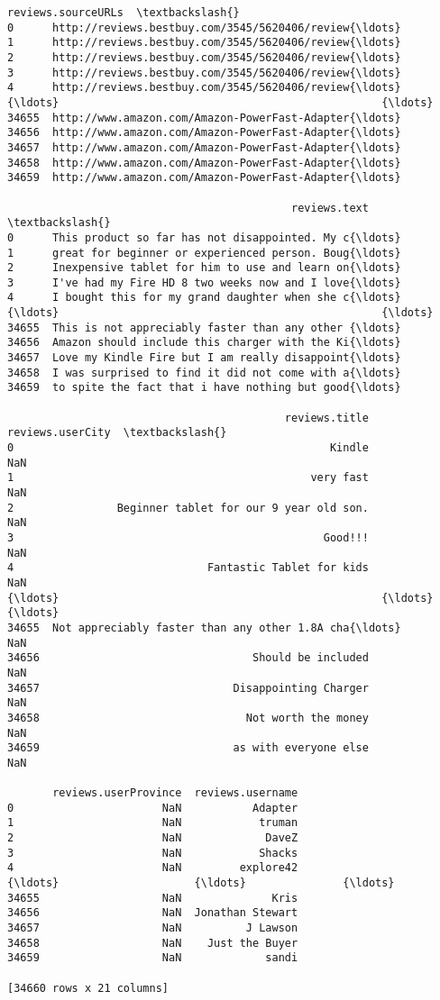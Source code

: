 \documentclass[11pt]{article}
\begin{document}
\begin{Verbatim}[commandchars=\\\{\}]
                                      reviews.sourceURLs  \textbackslash{}
0      http://reviews.bestbuy.com/3545/5620406/review{\ldots}
1      http://reviews.bestbuy.com/3545/5620406/review{\ldots}
2      http://reviews.bestbuy.com/3545/5620406/review{\ldots}
3      http://reviews.bestbuy.com/3545/5620406/review{\ldots}
4      http://reviews.bestbuy.com/3545/5620406/review{\ldots}
{\ldots}                                                  {\ldots}
34655  http://www.amazon.com/Amazon-PowerFast-Adapter{\ldots}
34656  http://www.amazon.com/Amazon-PowerFast-Adapter{\ldots}
34657  http://www.amazon.com/Amazon-PowerFast-Adapter{\ldots}
34658  http://www.amazon.com/Amazon-PowerFast-Adapter{\ldots}
34659  http://www.amazon.com/Amazon-PowerFast-Adapter{\ldots}

                                            reviews.text  \textbackslash{}
0      This product so far has not disappointed. My c{\ldots}
1      great for beginner or experienced person. Boug{\ldots}
2      Inexpensive tablet for him to use and learn on{\ldots}
3      I've had my Fire HD 8 two weeks now and I love{\ldots}
4      I bought this for my grand daughter when she c{\ldots}
{\ldots}                                                  {\ldots}
34655  This is not appreciably faster than any other {\ldots}
34656  Amazon should include this charger with the Ki{\ldots}
34657  Love my Kindle Fire but I am really disappoint{\ldots}
34658  I was surprised to find it did not come with a{\ldots}
34659  to spite the fact that i have nothing but good{\ldots}

                                           reviews.title reviews.userCity  \textbackslash{}
0                                                 Kindle              NaN
1                                              very fast              NaN
2                Beginner tablet for our 9 year old son.              NaN
3                                                Good!!!              NaN
4                              Fantastic Tablet for kids              NaN
{\ldots}                                                  {\ldots}              {\ldots}
34655  Not appreciably faster than any other 1.8A cha{\ldots}              NaN
34656                                 Should be included              NaN
34657                              Disappointing Charger              NaN
34658                                Not worth the money              NaN
34659                              as with everyone else              NaN

       reviews.userProvince  reviews.username
0                       NaN           Adapter
1                       NaN            truman
2                       NaN             DaveZ
3                       NaN            Shacks
4                       NaN         explore42
{\ldots}                     {\ldots}               {\ldots}
34655                   NaN              Kris
34656                   NaN  Jonathan Stewart
34657                   NaN          J Lawson
34658                   NaN    Just the Buyer
34659                   NaN             sandi

[34660 rows x 21 columns]
    \end{Verbatim}
\end{document}
